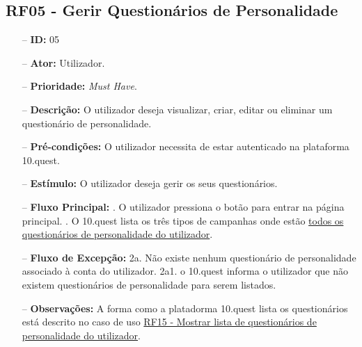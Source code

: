 \begin{comment}

\subsection{RF04 - Lista de utilizadores}
\begin{itemize}
	\item[--] \textbf{ID:} 04
	\item[--]  \textbf{Ator:} 
	\item[--]  \textbf{Prioridade:}
	\item[--]  \textbf{Descrição:} 
	\item[--]  \textbf{Pré-condições:} 
	\item[--]  \textbf{Estimulo:}
	\item[--]  \textbf{Fluxo Principal:} 
		\subitem
		\subitem
		\subitem
		\subitem
	\item[--]  \textbf{Fluxo de Excepção:} 
		\subitem
		\subitem
		\subitem
		\subitem
	\item[--]  \textbf{Observações:} 
\end{itemize}
\newpage
\end{comment}

\subsection{RF05 - Gerir Questionários de Personalidade}
\begin{itemize}
	\item[--] \textbf{ID:} 05
	\item[--]  \textbf{Ator:} Utilizador.
	\item[--]  \textbf{Prioridade:} \textit{Must Have}.
	\item[--]  \textbf{Descrição:} O utilizador deseja visualizar, criar, editar ou eliminar um questionário de personalidade.
	\item[--]  \textbf{Pré-condições:} O utilizador necessita de estar autenticado na plataforma 10.quest.
	\item[--]  \textbf{Estímulo:} O utilizador deseja gerir os seus questionários.
	\item[--]  \textbf{Fluxo Principal:} 
		. O utilizador pressiona o botão para entrar na página principal.
		. O 10.quest lista os três tipos de campanhas onde estão \underline{todos os questionários de personalidade do utilizador}.
	\item[--]  \textbf{Fluxo de Excepção:} 
		\subitem 2a. Não existe nenhum questionário de personalidade associado à conta do utilizador.
		\subitem 2a1. o 10.quest informa o utilizador que não existem questionários de personalidade para serem listados.
	\item[--]  \textbf{Observações:} A forma como a platadorma 10.quest lista os questionários está descrito no caso de uso \underline{RF15 - Mostrar lista de questionários de personalidade do utilizador}.
\end{itemize}
\newpage

